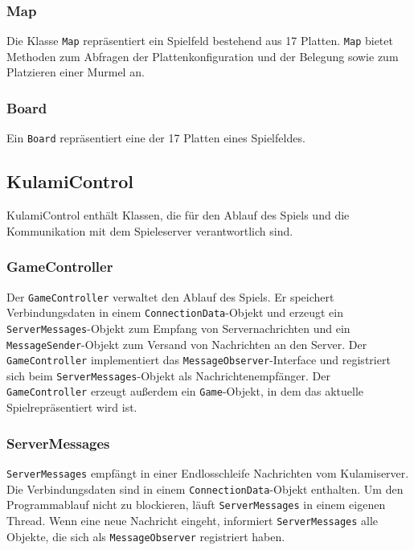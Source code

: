 \documentclass{scrartcl}
\begin{document}
\subsubsection{Map}
\label{sec:Map}

Die Klasse \texttt{Map} repräsentiert ein Spielfeld bestehend aus 17 Platten.  \texttt{Map} bietet Methoden zum Abfragen der Plattenkonfiguration und der Belegung sowie zum Platzieren einer Murmel an.

\subsubsection{Board}
\label{sec:Board}

Ein \texttt{Board} repräsentiert eine der 17 Platten eines Spielfeldes.

\subsection{KulamiControl}

KulamiControl enthält Klassen, die für den Ablauf des Spiels und die Kommunikation mit dem Spieleserver verantwortlich sind.

\subsubsection{GameController}
\label{sec:GameController}

Der \texttt{GameController} verwaltet den Ablauf des Spiels.  Er speichert Verbindungsdaten in einem \texttt{ConnectionData}-Objekt und erzeugt ein \texttt{ServerMessages}-Objekt zum Empfang von Servernachrichten und ein \texttt{MessageSender}-Objekt zum Versand von Nachrichten an den Server.  Der \texttt{GameController} implementiert das \texttt{MessageObserver}-Interface und registriert sich beim \texttt{ServerMessages}-Objekt als Nachrichtenempfänger.  Der \texttt{GameController} erzeugt außerdem ein \texttt{Game}-Objekt, in dem das aktuelle Spielrepräsentiert wird ist.


\subsubsection{ServerMessages}
\label{sec:ServerMessages}

\texttt{ServerMessages} empfängt in einer Endlosschleife Nachrichten vom Kulamiserver.  Die Verbindungsdaten sind in einem \texttt{ConnectionData}-Objekt enthalten.  Um den Programmablauf nicht zu blockieren, läuft \texttt{ServerMessages} in einem eigenen Thread.  Wenn eine neue Nachricht eingeht, informiert \texttt{ServerMessages} alle Objekte, die sich als \texttt{MessageObserver} registriert haben.
\end{document}
